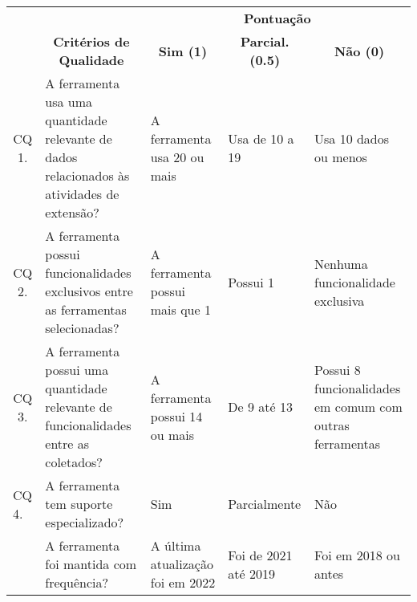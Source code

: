 \begin{table}[!htb]
  \centering
  \tiny
  \begin{tabular}{c|p{3.5cm}|p{1.5cm}|p{1.5cm}|p{2cm}}
    \bottomrule
    \rowcolor[rgb]{0.753,0.753,0.753} {\cellcolor[rgb]{0.753,0.753,0.753}}                              & \multicolumn{1}{c|}{{\cellcolor[rgb]{0.753,0.753,0.753}}}                                                  & \multicolumn{3}{c}{\textbf{\textbf{Pontuação}}}                                                                                                           \\
    \hhline{>{\arrayrulecolor[rgb]{0.753,0.753,0.753}}-->{\arrayrulecolor{black}}---}
    \rowcolor[rgb]{0.753,0.753,0.753} \multirow{-2}{*}{{\cellcolor[rgb]{0.753,0.753,0.753}}\textbf{ID}} & \multicolumn{1}{c|}{\multirow{-2}{*}{{\cellcolor[rgb]{0.753,0.753,0.753}}\textbf{Critérios de Qualidade}}} & \multicolumn{1}{c|}{\textbf{Sim (1)}}           & \multicolumn{1}{c|}{\textbf{Parcial. (0.5)}} & \multicolumn{1}{c}{\textbf{Não (0)}}                     \\
    \hline
    \rowcolor[rgb]{0.898,0.898,0.898} CQ 1.                                                             & A ferramenta usa uma quantidade relevante de dados relacionados às atividades de extensão?                 & A ferramenta usa 20 ou mais                     & Usa de 10 a 19                               & Usa 10 dados ou menos                                    \\
    CQ 2.                                                                                               & A ferramenta possui funcionalidades exclusivos entre as ferramentas selecionadas?                          & A ferramenta possui mais que 1                  & Possui 1                                     & Nenhuma funcionalidade exclusiva                         \\
    \rowcolor[rgb]{0.898,0.898,0.898} CQ 3.                                                             & A ferramenta possui uma quantidade relevante de funcionalidades entre as coletados?                        & A ferramenta possui 14 ou mais                  & De 9 até 13                                  & Possui 8 funcionalidades em comum com outras ferramentas \\
    \multicolumn{1}{l|}{CQ 4.}                                                                          & A ferramenta tem suporte especializado?                                                                    & Sim                                             & Parcialmente                                 & Não                                                      \\
    \rowcolor[rgb]{0.898,0.898,0.898} \multicolumn{1}{l|}{CQ 5.}                                        & A ferramenta foi mantida com frequência?                                                                   & A última atualização foi em 2022                & Foi de 2021 até 2019                         & Foi em 2018 ou antes                                     \\
    \toprule
  \end{tabular}
\end{table}
